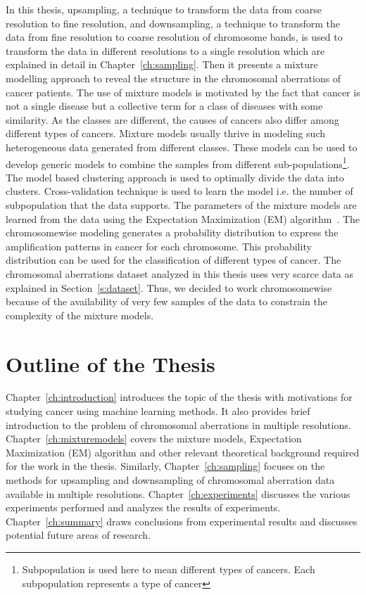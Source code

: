 In this thesis, upsampling, a technique to transform the data from coarse resolution to fine resolution, and downsampling, a technique to transform the data from fine resolution to coarse resolution of chromosome bands, is used to transform the data in different resolutions to a single resolution which are explained in detail in Chapter~\ref{ch:sampling}. Then it presents a mixture modelling approach to reveal the structure in the chromosomal aberrations of cancer patients. The use of mixture models is motivated by the fact that cancer is not a single disease but a collective term for a class of diseases with some similarity. As the classes are different, the causes of cancers also differ among different types of cancers. Mixture models usually thrive in modeling such heterogeneous data generated from different classes. These models can be used to develop generic models to combine the samples from different sub-populations\footnote{Subpopulation is used here to mean different types of cancers. Each subpopulation represents a type of cancer}. The model based clustering approach is used to optimally divide the data into clusters. Cross-validation technique is used to learn the model i.e. the number of subpopulation that the data supports. The parameters of the mixture models are learned from the data using the Expectation Maximization (EM) algorithm~\cite{wolfe, expectmax}. The chromosomewise modeling generates a probability distribution to express the amplification patterns in cancer for each chromosome. This probability distribution can be used for the classification of different types of cancer. The chromosomal aberrations dataset analyzed in this thesis uses very scarce data as explained in Section~\ref{s:dataset}. Thus, we decided to work chromosomewise because of the availability of very few samples of the data to constrain the complexity of the mixture models.


\section{Outline of the Thesis}
\label{s:outline}
Chapter~\ref{ch:introduction} introduces the topic of the thesis with motivations for studying cancer using machine learning methods. It also provides brief introduction to the problem of chromosomal aberrations in multiple resolutions. Chapter~\ref{ch:mixturemodels} covers the mixture models, Expectation Maximization (EM) algorithm and other relevant theoretical background required for the work in the thesis. Similarly, Chapter~\ref{ch:sampling} focuses on the methods for upsampling and downsampling of chromosomal aberration data available in multiple resolutions. Chapter~\ref{ch:experiments} discusses the various experiments performed and analyzes the results of experiments. Chapter~\ref{ch:summary} draws conclusions from experimental results and discusses potential future areas of research.


